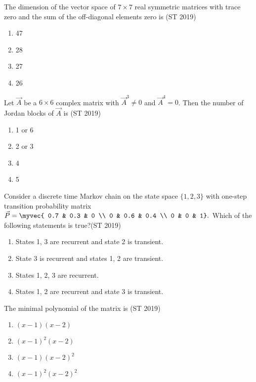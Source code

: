 \item The dimension of the vector space of \(7 \times 7\) real symmetric matrices with trace zero and the sum of the off-diagonal elements zero is \hfill(ST 2019)
\begin{multicols}{4}
\begin{enumerate}
    \item 47
    \item 28
    \item 27
    \item 26
\end{enumerate}
\end{multicols}
%
\item Let \(\vec{A}\) be a \(6 \times 6\) complex matrix with \(\vec{A}^3 \neq 0\) and \(\vec{A}^4 = 0\). Then the number of Jordan blocks of \(\vec{A}\) is \hfill(ST 2019)
\begin{multicols}{4}
\begin{enumerate}
     \item 1 or 6
     \item 2 or 3
     \item 4
     \item 5
\end{enumerate}
\end{multicols}
\item Consider a discrete time Markov chain on the state space \(\{1,2,3\}\) with one-step transition probability matrix
$\vec{P} = \myvec{
0.7 & 0.3 & 0 \\
0 & 0.6 & 0.4 \\
0 & 0 & 1}.$
Which of the following statements is true?\hfill(ST 2019)
\begin{enumerate}
\item States 1, 3 are recurrent and state 2 is transient.
\item State 3 is recurrent and states 1, 2 are transient.
\item States 1, 2, 3 are recurrent.
\item States 1, 2 are recurrent and state 3 is transient.
\end{enumerate}

\item The minimal polynomial of the matrix
is \hfill(ST 2019)
\begin{multicols}{4}
\begin{enumerate}
\item \((x - 1)(x - 2)\)
\item \((x - 1)^2 (x - 2)\)
\item \((x - 1)(x - 2)^2\)
\item \((x - 1)^2 (x - 2)^2\)
\end{enumerate}
\end{multicols}

